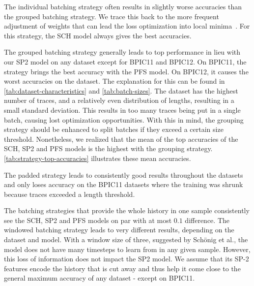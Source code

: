 The individual batching strategy often results in slightly worse accuracies than the grouped batching strategy. We trace this back to the more frequent adjustment of weights that can lead the loss optimization into local minima~\cite{keskar2016large}. For this strategy, the SCH model always gives the best accuracies.

The grouped batching strategy generally leads to top performance in lieu with our SP2 model on any dataset except for BPIC11 and BPIC12. On BPIC11, the strategy brings the best accuracy with the PFS model. On BPIC12, it causes the worst accuracies on the dataset. The explanation for this can be found in \autoref{tab:dataset-characteristics} and \autoref{tab:batch-sizes}. The dataset has the highest number of traces, and a relatively even distribution of lengths, resulting in a small standard deviation. This results in too many traces being put in a single batch, causing lost optimization opportunities. With this in mind, the grouping strategy should be enhanced to split batches if they exceed a certain size threshold. Nonetheless, we realized that the mean of the top accuracies of the SCH, SP2 and PFS models is the highest with the grouping strategy. \autoref{tab:strategy-top-accuracies} illustrates these mean accuracies.

The padded strategy leads to consistently good results throughout the datasets and only loses accuracy on the BPIC11 datasets where the training was shrunk because traces exceeded a length threshold.

The batching strategies that provide the whole history in one sample consistently see the SCH, SP2 and PFS models on par with at most $0.1$ difference. The windowed batching strategy leads to very different results, depending on the dataset and model. With a window size of three, suggested by Schönig et al., the model does not have many timesteps to learn from in any given sample. However, this loss of information does not impact the SP2 model. We assume that its SP-2 features encode the history that is cut away and thus help it come close to the general maximum accuracy of any dataset - except on BPIC11.


